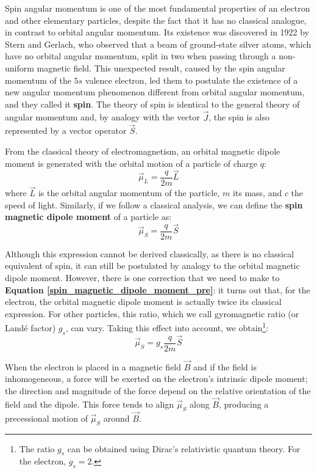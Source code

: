 Spin angular momentum is one of the most fundamental properties of an electron and other elementary particles, despite the fact that it has no classical analogue, in contrast to orbital angular momentum. Its existence was discovered in 1922 by Stern and Gerlach, who observed that a beam of ground-state silver atoms, which have no orbital angular momentum, split in two when passing through a non-uniform magnetic field. This unexpected result, caused by the spin angular momentum of the $5s$ valence electron, led them to postulate the existence of a new angular momentum phenomenon different from orbital angular momentum, and they called it \textbf{spin}. The theory of spin is identical to the general theory of angular momentum and, by analogy with the vector $\vec{J}$, the spin is also represented by a vector operator $\vec{S}$.

From the classical theory of electromagnetism, an orbital magnetic dipole moment is generated with the orbital motion of a particle of charge $q$:
\begin{equation} \label{orbital_magnetic_dipole_moment}
    \vec{\mu}_L = \frac{q}{2m}\vec{L}
\end{equation}
where $\vec{L}$ is the orbital angular momentum of the particle, $m$ its mass, and $c$ the speed of light. Similarly, if we follow a classical analysis, we can define the \textbf{spin magnetic dipole moment} of a particle as:
\begin{equation} \label{spin_magnetic_dipole_moment_pre}
    \vec{\mu}_S = \frac{q}{2m}\vec{S}
\end{equation}

Although this expression cannot be derived classically, as there is no classical equivalent of spin, it can still be postulated by analogy to the orbital magnetic dipole moment. However, there is one correction that we need to make to \textbf{Equation \ref{spin_magnetic_dipole_moment_pre}}: it turns out that, for the electron, the orbital magnetic dipole moment is actually twice its classical expression. For other particles, this ratio, which we call gyromagnetic ratio (or Landé factor) $g_s$, can vary. Taking this effect into account, we obtain\footnote{The ratio $g_s$ can be obtained using Dirac's relativistic quantum theory. For the electron, $g_s = 2$.}:
\begin{equation} \label{spin_magnetic_dipole_moment}
    \vec{\mu}_S = g_s\frac{q}{2m}\vec{S}
\end{equation}

When the electron is placed in a magnetic field $\vec{B}$ and if the field is inhomogeneous, a force will be exerted on the electron's intrinsic dipole moment; the direction and magnitude of the force depend on the relative orientation of the field and the dipole. This force tends to align $\vec{\mu}_S$  along $\vec{B}$, producing a precessional motion of $\vec{\mu}_S$ around $\vec{B}$.



